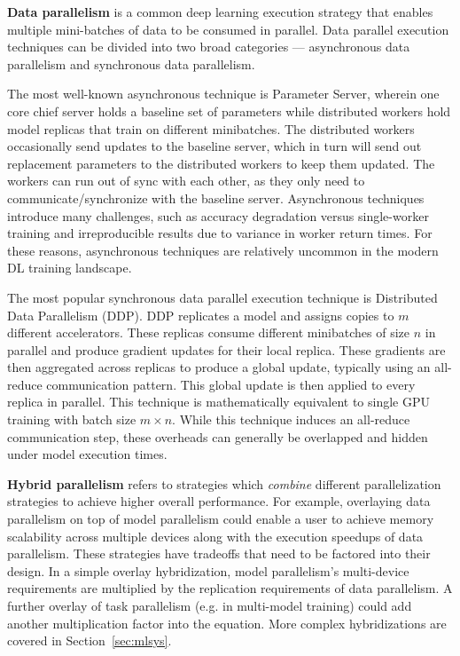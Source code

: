\textbf{Data parallelism} is a common deep learning execution strategy that enables multiple mini-batches of data to be consumed in parallel. Data parallel execution techniques can be divided into two broad categories --- asynchronous data parallelism and synchronous data parallelism. 

The most well-known asynchronous technique is Parameter Server, wherein one core chief server holds a baseline set of parameters while distributed workers hold model replicas that train on different minibatches. The distributed workers occasionally send updates to the baseline server, which in turn will send out replacement parameters to the distributed workers to keep them updated. The workers can run out of sync with each other, as they only need to communicate/synchronize with the baseline server. Asynchronous techniques introduce many challenges, such as accuracy degradation versus single-worker training and irreproducible results due to variance in worker return times. For these reasons, asynchronous techniques are relatively uncommon in the modern DL training landscape. 

The most popular synchronous data parallel execution technique is Distributed Data Parallelism (DDP). DDP replicates a model and assigns copies to $m$ different accelerators. These replicas consume different minibatches of size $n$ in parallel and produce gradient updates for their local replica. These gradients are then aggregated across replicas to produce a global update, typically using an all-reduce communication pattern. This global update is then applied to every replica in parallel. This technique is mathematically equivalent to single GPU training with batch size $m \times n$. While this technique induces an all-reduce communication step, these overheads can generally be overlapped and hidden under model execution times.

\textbf{Hybrid parallelism} refers to strategies which \textit{combine} different parallelization strategies to achieve higher overall performance. For example, overlaying data parallelism on top of model parallelism could enable a user to achieve memory scalability across multiple devices along with the execution speedups of data parallelism. These strategies have tradeoffs that need to be factored into their design. In a simple overlay hybridization, model parallelism's multi-device requirements are multiplied by the replication requirements of data parallelism. A further overlay of task parallelism (e.g. in multi-model training) could add another multiplication factor into the equation. More complex hybridizations are covered in Section~\ref{sec:mlsys}.

